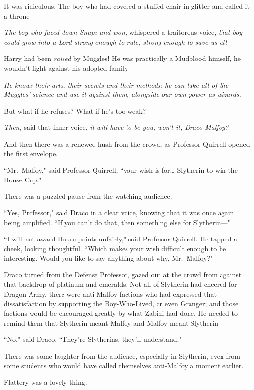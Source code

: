 It was ridiculous. The boy who had covered a stuffed chair in glitter and called it a throne---

\emph{The boy who faced down Snape and won,} whispered a traitorous voice, \emph{that boy could grow into a Lord strong enough to rule, strong enough to save us all---}

Harry had been \emph{raised} by Muggles! He was practically a Mudblood himself, he wouldn't fight against his adopted family---

\emph{He knows their arts, their secrets and their methods; he can take all of the Muggles' science and use it against them, alongside our own power as wizards.}

But what if he refuses? What if he's too weak?

\emph{Then,} said that inner voice, \emph{it will have to be you, won't it, Draco Malfoy?}

And then there was a renewed hush from the crowd, as Professor Quirrell opened the first envelope.

``Mr.~Malfoy," said Professor Quirrell, ``your wish is for{\ldots} Slytherin to win the House Cup."

There was a puzzled pause from the watching audience.

``Yes, Professor," said Draco in a clear voice, knowing that it was once again being amplified. ``If you can't do that, then something else for Slytherin---"

``I will not award House points unfairly," said Professor Quirrell. He tapped a cheek, looking thoughtful. ``Which makes your wish difficult enough to be interesting. Would you like to say anything about why, Mr.~Malfoy?"

Draco turned from the Defense Professor, gazed out at the crowd from against that backdrop of platinum and emeralds. Not all of Slytherin had cheered for Dragon Army, there were anti-Malfoy factions who had expressed that dissatisfaction by supporting the Boy-Who-Lived, or even Granger; and those factions would be encouraged greatly by what Zabini had done. He needed to remind them that Slytherin meant Malfoy and Malfoy meant Slytherin---

``No," said Draco. ``They're Slytherins, they'll understand."

There was some laughter from the audience, especially in Slytherin, even from some students who would have called themselves anti-Malfoy a moment earlier.

Flattery was a lovely thing.

